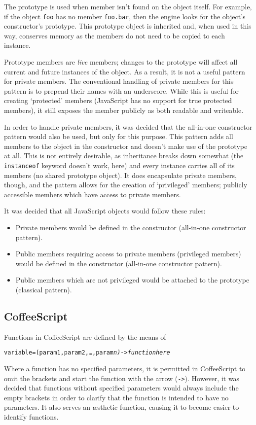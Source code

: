 The prototype is used when member isn't found on the object itself. For example, if the object \texttt{foo} has no member \texttt{foo.bar}, then the engine looks for the object's constructor's prototype. This prototype object is inherited and, when used in this way, conserves memory as the members do not need to be copied to each instance.

Prototype members are \emph{live} members; changes to the prototype will affect all current and future instances of the object. As a result, it is not a useful pattern for private members. The conventional handling of private members for this pattern is to prepend their names with an underscore. While this is useful for creating `protected' members (Java\-Script has no support for true protected members), it still exposes the member publicly as both readable and writeable.

In order to handle private members, it was decided that the all-in-one constructor pattern would also be used, but only for this purpose. This pattern adds all members to the object in the constructor and doesn't make use of the prototype at all. This is not entirely desirable, as inheritance breaks down somewhat (the \texttt{instanceof} keyword doesn't work, here) and every instance carries all of its members (no shared prototype object). It does encapsulate private members, though, and the pattern allows for the creation of `privileged' members; publicly accessible members which have access to private members.

It was decided that all Java\-Script objects would follow these rules:
\begin{itemize}
	\item Private members would be defined in the constructor (all-in-one constructor pattern).
	\item Public members requiring access to private members (privileged members) would be defined in the constructor (all-in-one constructor pattern).
	\item Public members which are not privileged would be attached to the prototype (classical pattern).
\end{itemize}

\subsection{CoffeeScript}
Functions in Coffee\-Script are defined by the means of
\begin{alltt}variable = (param1, param2, \ldots, param\slshape{n}\upshape) -> function here\end{alltt}
Where a function has no specified parameters, it is permitted in Coffee\-Script to omit the brackets and start the function with the arrow (\texttt{->}). However, it was decided that functions without specified parameters would always include the empty brackets in order to clarify that the function is intended to have no parameters. It also serves an \ae{}sthetic function, causing it to become easier to identify functions.

